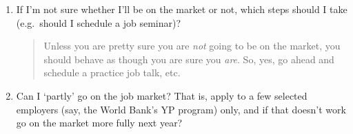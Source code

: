 \documentclass{\classes/econtex}
\begin{document}
\begin{enumerate}
\begin{quote}
\begin{comment}
        So, an important real and psychological point here is that failure
        to be included in the official list of candidates is almost (but not
        quite) equivalent to the end of all hope of obtaining a JHU PhD.  If
        a student uses wisely the time freed up by not participating in the
        job market to conduct an intense burst of high quality research, it
        is in principle quite possible that they will finish a dissertation
        despite their prior lack of progress.  The exclusion from the job
        market process may concentrate their minds in a way that has not
        happened before.

        Furthermore, if their dissertation defense occurs before the
        deadline for the `on-the-market' decision in the following year (mid
        October), the student can apply to jobs themselves (with the usual
        process, including advisors writing letters and giving them to the
        \JMStaff, etc), but without their name being officially
        included in list of `on-the-market' students.  They can also have a page on the dept
        website to which they can refer employers, but will not be included
        in the list of students ``on the market'' clickable from the main
        dept web page.  The
        situation will be explained candidly to employers as resulting from
        our inflexible rule that students must be on the market in their 6th
        year or earlier.  This is what we did with Farhan Hameed this year,
        and he did eventually get a couple of mediocre job offers, one of
        which he has accepted.

      \end{comment}


    \end{quote}
  \item  If I'm not sure whether I'll be on the market or not,
    which steps should I take (e.g.\ should I schedule a job 
    seminar)?

    \begin{quote}
      Unless you are pretty sure you are \textit{not} going to be on the
      market, you should behave as though you are sure you \textit{are}.  So,
      yes, go ahead and schedule a practice job talk, etc.

    \end{quote}
  \item  Can I `partly' go on the job market?  That is, apply to a few
    selected employers (say, the World Bank's YP program) only, and 
    if that doesn't work go on the market more fully next year?


\end{enumerate}
\end{document}
